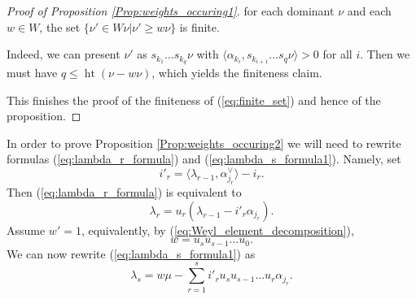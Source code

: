 \documentclass{amsart}
\theoremstyle{definition}
\numberwithin{equation}{section}
\begin{document}
\begin{proof}[Proof of Proposition \ref{Prop:weights_occuring1}]
for each dominant $\nu$ and each $w\in W$, the set $\{\nu'\in W\nu| \nu'\geqslant w\nu\}$ is finite. 

Indeed, we can present $\nu'$ as $s_{k_1}\ldots s_{k_q}\nu$ with $\langle\alpha_{k_i},s_{k_{i+1}}\ldots s_q\nu \rangle>0$ for all $i$. Then we must have $q\leqslant \operatorname{ht}(\nu-w\nu)$, which yields the finiteness claim.

This finishes the proof of the finiteness of (\ref{eq:finite_set}) and hence of the proposition.

\end{proof}

In order to prove Proposition \ref{Prop:weights_occuring2} we will need to rewrite formulas (\ref{eq:lambda_r_formula}) and
(\ref{eq:lambda_s_formula1}). Namely, set
$$i'_r=\langle\lambda_{r-1},\alpha^\vee_{j_r}\rangle{-}i_r.$$
Then (\ref{eq:lambda_r_formula}) is equivalent to
$$\lambda_r=u_r(\lambda_{r-1}-i'_r\alpha_{j_r}).$$
Assume $w'=1$, equivalently, by (\ref{eq:Weyl_element_decomposition}),
\begin{equation}
w=u_s u_{s-1}\ldots u_0.
\end{equation}
We can now rewrite (\ref{eq:lambda_s_formula1}) as
\begin{equation}\label{eq:lambda_s_formula2}
\lambda_s=w\mu-\sum_{r=1}^s i'_r u_su_{s-1}\ldots u_r\alpha_{j_r}.
\end{equation}
\end{document}
